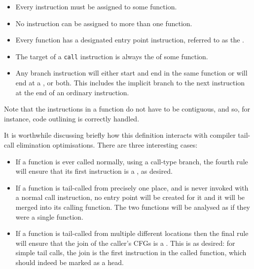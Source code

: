 \begin{itemize}
\item
  Every instruction must be assigned to some function.
\item
  No instruction can be assigned to more than one function.
\item
  Every function has a designated entry point instruction, referred to
  as the .
\item
  The target of a \texttt{call} instruction is always the
   of some function.
\item
  Any branch instruction will either start and end in the same
  function or will end at a , or both.  This
  includes the implicit branch to the next instruction at the end of
  an ordinary instruction.
\end{itemize}

Note that the instructions in a function do not have to be contiguous,
and so, for instance, code outlining is correctly
handled.

It is worthwhile discussing briefly how this definition interacts with
compiler tail-call elimination optimisations.  There are three
interesting cases:

\begin{itemize}
\item
  If a function is ever called normally, using a call-type branch, the
  fourth rule will ensure that its first instruction is a
  , as desired.
\item
  If a function is tail-called from precisely one place, and is never
  invoked with a normal call instruction, no entry point will be
  created for it and it will be merged into its calling function.  The
  two functions will be analysed as if they were a single function.
\item
  If a function is tail-called from multiple different locations then
  the final rule will ensure that the join of the caller's CFGs is a
  .  This is as desired: for simple tail calls,
  the join is the first instruction in the called function, which should
  indeed be marked as a head.
\end{itemize}

